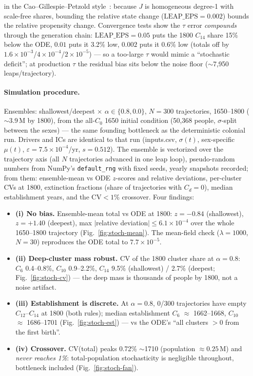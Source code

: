 \documentclass[11pt,a4paper]{article}
\begin{document}
in the Cao--Gillespie--Petzold style~\cite{cao-gillespie-petzold-2006}:
because $J$ is homogeneous degree-1 with scale-free shares, bounding the
relative state change ($\mathrm{LEAP\_EPS}=0.002$) bounds the relative
propensity change.  Convergence tests show the $\tau$ error
\emph{compounds} through the generation chain:
$\mathrm{LEAP\_EPS}=0.05$ puts the 1800 $C_{14}$ share 15\% below the
ODE, $0.01$ puts it 3.2\% low, $0.002$ puts it 0.6\% low (totals off by
$1.6\times10^{-3}$/$4\times10^{-4}$/$2\times10^{-5}$) --- so a too-large
$\tau$ would mimic a ``stochastic deficit''; at production $\tau$ the
residual bias sits below the noise floor ($\sim$7,950 leaps/trajectory).

\paragraph{Simulation procedure.}  Ensembles: shallowest/deepest
$\times$ $\alpha\in\{0.8,0.0\}$, $N=300$ trajectories, 1650--1800
($\sim$3.9\,M by 1800), from the all-$C_0$ 1650 initial condition
(50,368 people, $\sigma$-split between the sexes) --- the same founding
bottleneck as the deterministic colonial run.  Drivers and ICs are
identical to that run (inputs.csv, $\sigma(t)$, sex-specific $\mu(t)$,
$\varepsilon=7.5\times10^{-4}$/yr, $s=0.512$).  The ensemble is
vectorized over the trajectory axis (all $N$ trajectories advanced in
one leap loop), pseudo-random numbers from NumPy's
\texttt{default\_rng} with fixed seeds, yearly snapshots recorded; from
them: ensemble-mean vs ODE $z$-scores and relative deviations,
per-cluster CVs at 1800, extinction fractions (share of trajectories
with $C_d=0$), median establishment years, and the CV$<1$\% crossover.
Four findings:
\begin{itemize}
  \item \textbf{(i) No bias.}  Ensemble-mean total vs ODE at 1800:
    $z=-0.84$ (shallowest), $z=+1.40$ (deepest), max $|$relative
    deviation$|\le6.1\times10^{-4}$ over the whole 1650--1800
    trajectory (Fig.~\ref{fig:stoch-mean}).  The mean-field check
    ($\lambda=1000$, $N=30$) reproduces the ODE total to
    $7.7\times10^{-5}$.
  \item \textbf{(ii) Deep-cluster mass robust.}  CV of the 1800 cluster
    share at $\alpha=0.8$: $C_6$ 0.4--0.8\%, $C_{10}$ 0.9--2.2\%,
    $C_{14}$ 9.5\% (shallowest) / 2.7\% (deepest;
    Fig.~\ref{fig:stoch-cv}) --- the deep mass is thousands of people
    by 1800, not a noise artifact.
  \item \textbf{(iii) Establishment is discrete.}  At $\alpha=0.8$,
    0/300 trajectories have empty $C_{12}$--$C_{14}$ at 1800 (both
    rules); median establishment $C_6$ $\approx$ 1662--1668, $C_{10}$
    $\approx$ 1686--1701 (Fig.~\ref{fig:stoch-est}) --- vs the ODE's
    ``all clusters $>0$ from the first birth''.
  \item \textbf{(iv) Crossover.}  CV(total) peaks 0.72\% $\sim$1710
    (population $\approx 0.25$\,M) and \emph{never reaches 1\%}:
    total-population stochasticity is negligible throughout,
    bottleneck included (Fig.~\ref{fig:stoch-fan}).
\end{itemize}
\end{document}
